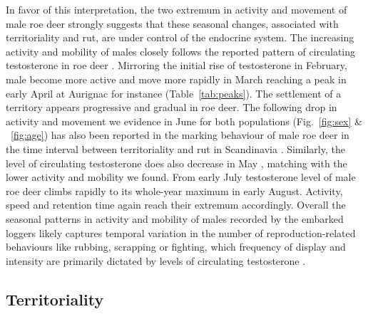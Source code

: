 \documentclass[a4paper,11pt]{article}
\begin{document}

In favor of this interpretation, the two extremum in activity and movement of male roe deer strongly suggests that these seasonal changes, associated with territoriality and rut, are under control of the endocrine system. The increasing activity and mobility of males closely follows the reported pattern of circulating testosterone in roe deer \citep{sempere_influence_1992}. Mirroring the initial rise of testosterone in February, male become more active and move more rapidly in March reaching a peak in early April at Aurignac for instance (Table~\ref{tab:peaks}). The settlement of a territory appears progressive and gradual in roe deer. The following drop in activity and movement we evidence in June for both populations (Fig.~\ref{fig:sex} \& ~\ref{fig:age}) has also been reported in the marking behaviour of male roe deer in the time interval between territoriality and rut in Scandinavia \citep{johansson_functional_1996, andersen_mating_1998}. Similarly, the level of circulating testosterone does also decrease in May  \citep{sempere_influence_1992}, matching with the lower activity and mobility we found. From early July testosterone level of male roe deer climbs rapidly to its whole-year maximum in early August. Activity, speed and retention time again reach their extremum accordingly. Overall the seasonal patterns in activity and mobility of males recorded by the embarked loggers likely captures temporal variation in the number of reproduction-related behaviours like rubbing, scrapping or fighting, which frequency of display and intensity are primarily dictated by levels of circulating testosterone \citep{miller_dominance_1987, hau_regulation_2007}.



\subsection*{Territoriality}
\end{document}
